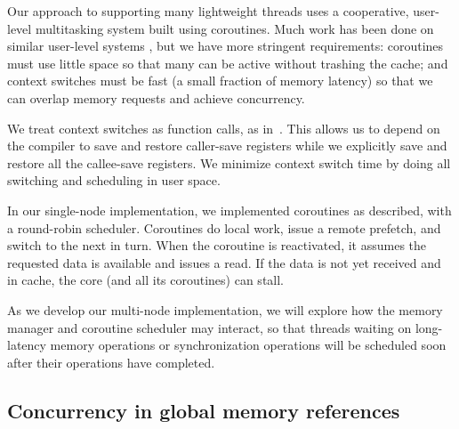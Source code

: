 \documentclass[10pt,nocopyrightspace,preprint]{sigplanconf}
\begin{document}
Our approach to supporting many lightweight threads uses a
cooperative, user-level multitasking system built using
coroutines. Much work has been done on similar user-level systems
\cite{ult,capriccio}, but we have more stringent requirements:
coroutines must use little space so that many can be active without
trashing the cache; and context switches must be fast (a small
fraction of memory latency) so that we can overlap memory requests and
achieve concurrency.

  We treat context switches as function calls, as
in~\cite{charm}. This allows us to depend on the compiler to save and
restore caller-save registers while we explicitly save and restore all
the callee-save registers.  We minimize context switch time by doing
all switching and scheduling in user space.

In our single-node implementation, we implemented coroutines
as described, with a round-robin scheduler. Coroutines do local work,
issue a remote prefetch, and switch to the next in turn.  When the
coroutine is reactivated, it assumes the requested data is available
and issues a read.  If the data is not yet received and in cache, the core
(and all its coroutines) can stall.

As we develop our multi-node implementation, we will explore how the memory manager and coroutine scheduler may
interact, so that threads waiting on long-latency memory operations or
synchronization operations will be scheduled soon after their
operations have completed.

\subsection{Concurrency in global memory references}
\end{document}
